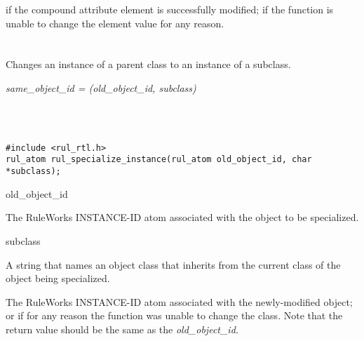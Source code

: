 \ReturnValue

 if the compound attribute element is successfully modified;
 if the function is unable to change the element value for
any reason.

\begin{seealso}




\end{seealso}

\section*{}

Changes an instance of a parent class to an instance of a subclass.

\Syntax

\it{same\_object\_id} =
(\it{old\_object\_id}, \it{subclass})

\begin{args}
   \\
   \\
\end{args}

\CBinding
\begin{verbatim}
#include <rul_rtl.h>
rul_atom rul_specialize_instance(rul_atom old_object_id, char *subclass);
\end{verbatim}

\begin{arguments}
\item[old\_object\_id]

  The RuleWorks INSTANCE-ID atom associated with the object to be
  specialized.

\item[subclass]

  A string that names an object class that inherits from the current
  class of the object being specialized.
\end{arguments}

\ReturnValue

The RuleWorks INSTANCE-ID atom associated with the newly-modified
object; or  if for any reason the function was
unable to change the class. Note that the return value should be the
same as the \it{old\_object\_id}.

